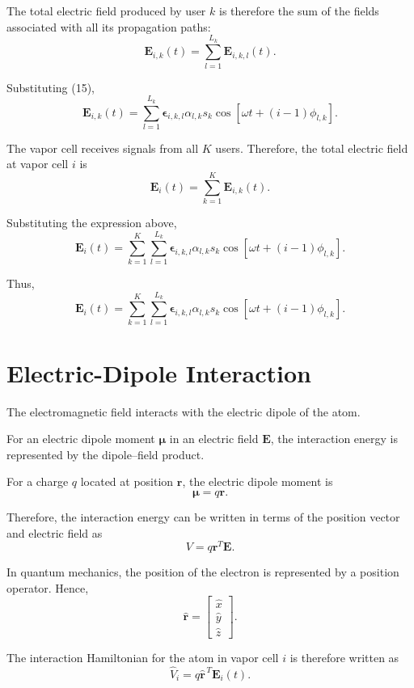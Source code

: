 \documentclass[12pt,a4paper]{article}
\begin{document}
The total electric field produced by user \(k\) is therefore the
sum of the fields associated with all its propagation paths:
\[
\mathbf E_{i,k}(t)
=
\sum_{l=1}^{L_k}
\mathbf E_{i,k,l}(t).
\]

Substituting (15),
\[
\mathbf E_{i,k}(t)
=
\sum_{l=1}^{L_k}
\boldsymbol{\epsilon}_{i,k,l}
\alpha_{l,k}s_k
\cos
\left[
\omega t+(i-1)\phi_{l,k}
\right].
\]

The vapor cell receives signals from all \(K\) users. Therefore,
the total electric field at vapor cell \(i\) is
\[
\mathbf E_i(t)
=
\sum_{k=1}^{K}
\mathbf E_{i,k}(t).
\]

Substituting the expression above,
\[
\mathbf E_i(t)
=
\sum_{k=1}^{K}
\sum_{l=1}^{L_k}
\boldsymbol{\epsilon}_{i,k,l}
\alpha_{l,k}s_k
\cos
\left[
\omega t+(i-1)\phi_{l,k}
\right].
\]

Thus,
\begin{equation}
\boxed{
\mathbf E_i(t)
=
\sum_{k=1}^{K}
\sum_{l=1}^{L_k}
\boldsymbol{\epsilon}_{i,k,l}
\alpha_{l,k}s_k
\cos
\left[
\omega t+(i-1)\phi_{l,k}
\right].
}
\tag{16}
\end{equation}

\section{Electric-Dipole Interaction}

The electromagnetic field interacts with the electric dipole of
the atom.

For an electric dipole moment \(\boldsymbol{\mu}\) in an electric
field \(\mathbf E\), the interaction energy is represented by the
dipole--field product.

For a charge \(q\) located at position \(\mathbf r\), the electric
dipole moment is
\[
\boldsymbol{\mu}
=
q\mathbf r.
\]

Therefore, the interaction energy can be written in terms of the
position vector and electric field as
\[
V
=
q\mathbf r^{T}\mathbf E.
\]

In quantum mechanics, the position of the electron is represented
by a position operator. Hence,
\[
\hat{\mathbf r}
=
\begin{bmatrix}
\hat x\\
\hat y\\
\hat z
\end{bmatrix}.
\]

The interaction Hamiltonian for the atom in vapor cell \(i\) is
therefore written as
\begin{equation}
\boxed{
\hat V_i
=
q\hat{\mathbf r}^{\,T}\mathbf E_i(t).
}
\tag{17}
\end{equation}
\end{document}
